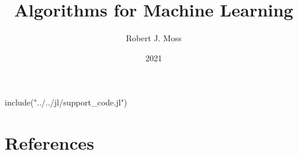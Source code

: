 \documentclass[fullbook]{tufte_algorithms_book}
\title{Algorithms for Machine Learning}
\author[Moss]{Robert J. Moss}
\date{2021}
\begin{document}
\begin{jlcode}
	include("../../jl/support_code.jl")
\end{jlcode}

\frontmatter

% 
% 

\tableofcontents\label{cha:toc}


% 
\mainmatter



\navheader{\currentname}

\backmatter

\chapter*{References}
\printbibliography[heading=none]

\printindex
\end{document}
